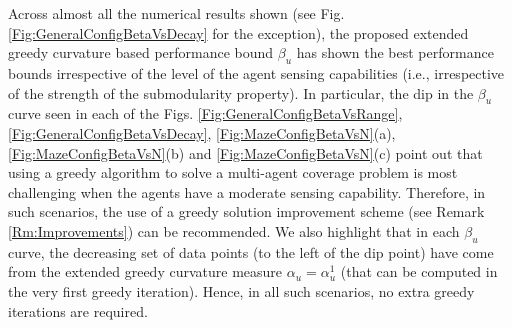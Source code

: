 \documentclass[conference]{IEEEtran}
\begin{document}
Across almost all the numerical results shown (see Fig. \ref{Fig:GeneralConfigBetaVsDecay} for the exception), the proposed extended greedy curvature based performance bound $\beta_u$ has shown the best performance bounds irrespective of the level of the agent sensing capabilities (i.e., irrespective of the strength of the submodularity property). In particular, the dip in the $\beta_u$ curve seen in each of the Figs. \ref{Fig:GeneralConfigBetaVsRange}, \ref{Fig:GeneralConfigBetaVsDecay}, \ref{Fig:MazeConfigBetaVsN}(a), \ref{Fig:MazeConfigBetaVsN}(b) and \ref{Fig:MazeConfigBetaVsN}(c) point out that using a greedy algorithm to solve a multi-agent coverage problem is most challenging when the agents have a moderate sensing capability. Therefore, in such scenarios, the use of a greedy solution improvement scheme (see Remark \ref{Rm:Improvements}) can be recommended. We also highlight that in each $\beta_u$ curve, the decreasing set of data points (to the left of the dip point) have come from the extended greedy curvature measure $\alpha_u = \alpha^1_u$ (that can be computed in the very first greedy iteration). Hence, in all such scenarios, no extra greedy iterations are required. 










\end{document}
